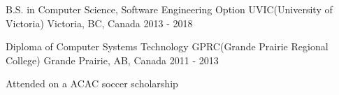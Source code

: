 


\begin{cventries}


\cventry
{B.S. in Computer Science, Software Engineering Option} %
{UVIC(University of Victoria)} %
{Victoria, BC, Canada} %
{2013 - 2018} %
{ %
\begin{cvitems}
\end{cvitems}
}

\cventry
{Diploma of Computer Systems Technology} %
{GPRC(Grande Prairie Regional College)} %
{Grande Prairie, AB, Canada} %
{2011 - 2013} %
{ %
\begin{cvitems}
\item {Attended on a ACAC soccer scholarship}
\end{cvitems}
}



\end{cventries}